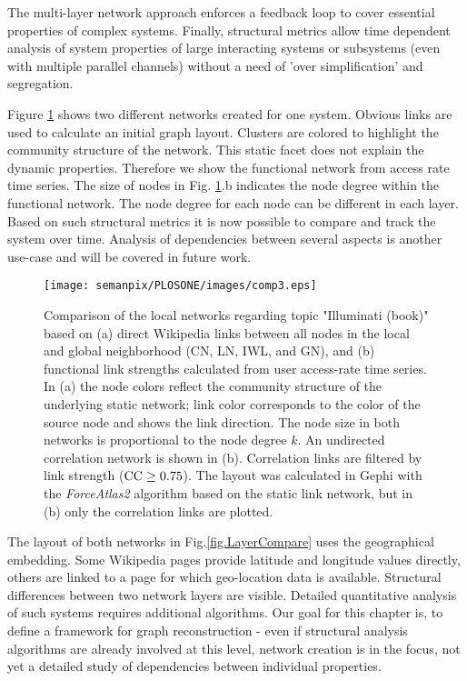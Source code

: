 \documentclass[a4paper,10pt]{scrbook}
\begin{document}
The multi-layer network approach enforces a feedback loop to cover essential properties of complex systems. Finally, structural metrics allow time dependent analysis of system properties of large interacting systems or subsystems (even with multiple parallel channels) without a need of 'over simplification' and segregation.

Figure \ref{fig.statnet} shows two different networks created for one system. Obvious links are used to calculate an initial graph layout. Clusters are colored to highlight the community structure of the network. This static facet does not explain the dynamic properties. Therefore we show the functional network from access rate time series. The size of nodes in Fig. \ref{fig.statnet}.b indicates the node degree within the functional network. The node degree for each node can be different in each layer. Based on such structural metrics it is now possible to compare and track the system over time. Analysis of dependencies between several aspects is another use-case and will be covered in future work.

\begin{figure}[th!]
\begin{center}\texttt{[image: semanpix/PLOSONE/images/comp3.eps]}\end{center}
\caption{Comparison of the local networks regarding topic "Illuminati (book)" based on (a) direct Wikipedia links between all nodes in the local and global neighborhood (CN, LN, IWL, and GN), and (b) functional link strengths calculated from user access-rate
time series. In (a) the node colors reflect the community structure of the
underlying static network; link color corresponds to the color of the source
node and shows the link direction. The node size in both networks is
proportional to the node degree $k$. An undirected correlation network is shown
in (b). Correlation links are filtered by link strength ($\rm CC \ge 0.75$).
The layout was calculated in Gephi \cite{ICWSM09154} with the \textit{ForceAtlas2}
algorithm based on the static link network, but in (b) only the correlation
links are plotted.}
\label{fig.statnet}
\end{figure}

The layout of both networks in Fig.\ref{fig.LayerCompare} uses the geographical embedding. Some Wikipedia pages provide latitude and longitude values directly, others are linked to a page for which geo-location data is available. Structural differences between two network layers are visible. Detailed quantitative analysis of such systems requires additional algorithms. Our goal for this chapter is, to define a framework for graph reconstruction - even if structural analysis algorithms are already involved at this level, network creation is in the focus, not yet a detailed study of dependencies between individual properties. 
\end{document}
